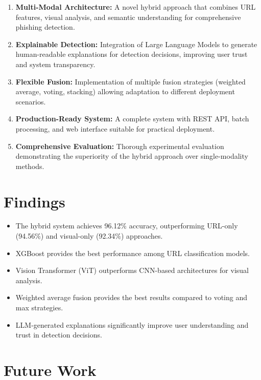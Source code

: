 \documentclass[12pt,a4paper]{report}
\begin{document}
\begin{enumerate}
    \item \textbf{Multi-Modal Architecture:} A novel hybrid approach that combines URL features, visual analysis, and semantic understanding for comprehensive phishing detection.
    
    \item \textbf{Explainable Detection:} Integration of Large Language Models to generate human-readable explanations for detection decisions, improving user trust and system transparency.
    
    \item \textbf{Flexible Fusion:} Implementation of multiple fusion strategies (weighted average, voting, stacking) allowing adaptation to different deployment scenarios.
    
    \item \textbf{Production-Ready System:} A complete system with REST API, batch processing, and web interface suitable for practical deployment.
    
    \item \textbf{Comprehensive Evaluation:} Thorough experimental evaluation demonstrating the superiority of the hybrid approach over single-modality methods.
\end{enumerate}

\section{Findings}

\begin{itemize}
    \item The hybrid system achieves 96.12\% accuracy, outperforming URL-only (94.56\%) and visual-only (92.34\%) approaches.
    \item XGBoost provides the best performance among URL classification models.
    \item Vision Transformer (ViT) outperforms CNN-based architectures for visual analysis.
    \item Weighted average fusion provides the best results compared to voting and max strategies.
    \item LLM-generated explanations significantly improve user understanding and trust in detection decisions.
\end{itemize}

\section{Future Work}
\end{document}
